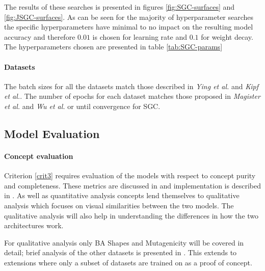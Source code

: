 The results of these searches is presented in figures \ref{fig:SGC-surfaces} and \ref{fig:JSGC-surfaces}.
As can be seen for the majority of hyperparameter searches the specific hyperparameters have minimal to no impact on the resulting model accuracy and therefore $0.01$ is chosen for learning rate and $0.1$ for weight decay.
The hyperparameters chosen are presented in table \ref{tab:SGC-params}

%

\paragraph{Datasets}
The batch sizes for all the datasets match those described in \textit{Ying et al.}\cite{ying2019gnnexplainer} and \textit{Kipf et al.}\cite{kipf2016semi}.
The number of epochs for each dataset matches those proposed in \textit{Magister et al.}\cite{magister2021gcexplainer} and \textit{Wu et al.}\cite{wu2019simplifying} or until convergence for SGC.

\subsection{Model Evaluation}
\label{sec:evaluation}

\paragraph{Concept evaluation}
Criterion \ref{crit3} requires evaluation of the models with respect to concept purity and completeness.
These metrics are discussed in  and implementation is described in .
As well as quantitative analysis concepts lend themselves to qualitative analysis which focuses on visual similarities between the two models.
The qualitative analysis will also help in understanding the differences in how the two architectures work.

For qualitative analysis only BA Shapes and Mutagenicity will be covered in detail; brief analysis of the other datasets is presented in .
This extends to extensions where only a subset of datasets are trained on as a proof of concept.

